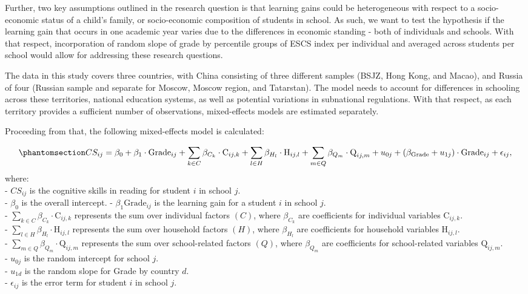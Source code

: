 \documentclass[
]{article}
\begin{document}
Further, two key assumptions outlined in the research question is that
learning gains could be heterogeneous with respect to a socio-economic
status of a child's family, or socio-economic composition of students in
school. As such, we want to test the hypothesis if the learning gain
that occurs in one academic year varies due to the differences in
economic standing - both of individuals and schools. With that respect,
incorporation of random slope of grade by percentile groups of ESCS
index per individual and averaged across students per school would allow
for addressing these research questions.

The data in this study covers three countries, with China consisting of
three different samples (BSJZ, Hong Kong, and Macao), and Russia of four
(Russian sample and separate for Moscow, Moscow region, and Tatarstan).
The model needs to account for differences in schooling across these
territories, national education systems, as well as potential variations
in subnational regulations. With that respect, as each territory
provides a sufficient number of observations, mixed-effects models are
estimated separately.

Proceeding from that, the following mixed-effects model is calculated:

\begin{equation}\phantomsection\label{eq-eq2}{
CS_{ij} = \beta_0 + \beta_1 \cdot \text{Grade}_{ij} + \sum_{k \in C} \beta_{C_k} \cdot \text{C}_{ij,k} + \sum_{l \in H} \beta_{H_l} \cdot \text{H}_{ij,l} + \sum_{m \in Q} \beta_{Q_m} \cdot \text{Q}_{ij,m} \\
+ u_{0j} + (\beta_{\text{Grade}} + u_{1j}) \cdot \text{Grade}_{ij} + \epsilon_{ij},
}\end{equation} where:\\
- \(CS_{ij}\) is the cognitive skills in reading for student \(i\) in
school \(j\).\\
- \(\beta_0\) is the overall intercept. - \(\beta_1 \text{Grade}_{ij}\)
is the learning gain for a student \(i\) in school \(j\).\\
- \(\sum\limits_{k \in C} \beta_{C_k} \cdot \text{C}_{ij,k}\) represents
the sum over individual factors \((C)\), where \(\beta_{C_k}\) are
coefficients for individual variables \(\text{C}_{ij,k}\).\\
- \(\sum\limits_{l \in H} \beta_{H_l} \cdot \text{H}_{ij,l}\) represents
the sum over household factors \((H)\), where \(\beta_{H_l}\) are
coefficients for household variables \(\text{H}_{ij,l}\).\\
- \(\sum\limits_{m \in Q} \beta_{Q_m} \cdot \text{Q}_{ij,m}\) represents
the sum over school-related factors \((Q)\), where \(\beta_{Q_m}\) are
coefficients for school-related variables \(\text{Q}_{ij,m}\).\\
- \(u_{0j}\) is the random intercept for school \(j\).\\
- \(u_{1d}\) is the random slope for Grade by country \(d\).\\
- \(\epsilon_{ij}\) is the error term for student \(i\) in school \(j\).
\end{document}

